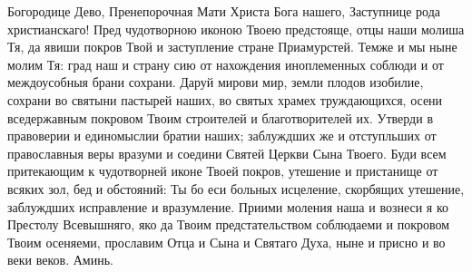 \mychapterending

\begin{mymulticols}

Богородице Дево, Пренепорочная Мати Христа Бога нашего, Заступнице рода христианскаго! Пред чудотворною иконою Твоею предстояще, отцы наши молиша Тя, да явиши покров Твой и заступление стране Приамурстей. Темже и мы ныне молим Тя: град наш и страну сию от нахождения иноплеменных соблюди и от междоусобныя брани сохрани. Даруй мирови мир, земли плодов изобилие, сохрани во святыни пастырей наших, во святых храмех труждающихся, осени вседержавным покровом Твоим строителей и благотворителей их. Утверди в правоверии и единомыслии братии наших; заблуждших же и отступльших от православныя веры вразуми и соедини Святей Церкви Сына Твоего. Буди всем притекающим к чудотворней  иконе Твоей покров, утешение и пристанище от всяких зол, бед и обстояний: Ты бо еси больных исцеление, скорбящих утешение, заблуждших исправление и вразумление. Приими моления наша и вознеси я ко Престолу Всевышняго, яко да Твоим предстательством соблюдаеми и покровом Твоим осеняеми, прославим Отца и Сына и Святаго Духа, ныне и присно и во веки веков. Аминь.

\end{mymulticols}

\mychapterending

